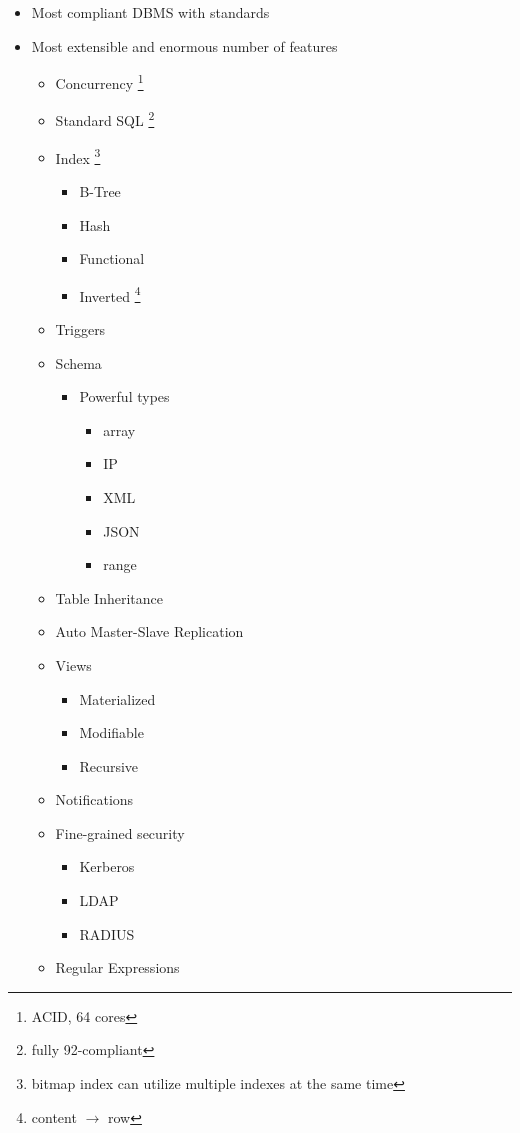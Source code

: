 \begin{itemize}
  \item Most compliant DBMS with standards
  \item Most extensible and enormous number of features
  \begin{itemize}
    \item Concurrency \footnote{ACID, 64 cores}
	\item Standard SQL \footnote{fully 92-compliant}
	\item Index \footnote{bitmap index can utilize multiple indexes at the same time}
	\begin{itemize}
	  \item B-Tree
	  \item Hash
	  \item Functional
	  \item Inverted \footnote{content $\rightarrow$ row}
	\end{itemize}
	\item Triggers
	\item Schema
	\begin{itemize}
	  \item Powerful types
	  \begin{itemize}
	    \item array
	    \item IP
	    \item XML
	    \item JSON
	    \item range
	  \end{itemize}
	\end{itemize}
	\item Table Inheritance
	\item Auto Master-Slave Replication
	\item Views
	\begin{itemize}
	  \item Materialized
	  \item Modifiable
	  \item Recursive
	\end{itemize}
	\item Notifications
	\item Fine-grained security
	\begin{itemize}
	  \item Kerberos
	  \item LDAP
	  \item RADIUS
	\end{itemize}
	\item Regular Expressions

\end{itemize}
\end{itemize}
